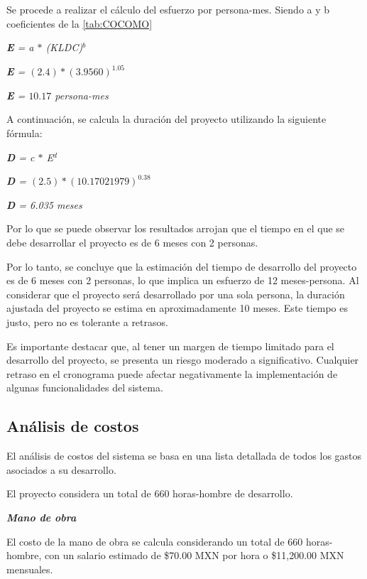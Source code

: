 Se procede a realizar el cálculo del esfuerzo por persona-mes. Siendo a y b coeficientes de la \autoref{tab:COCOMO}

\begin{center}
    \textit{\textbf{E} = a $*$ (KLDC)$^b$}

    \textit{\textbf{E} = $(2.4) * (3.9560)^1.05$}

    \textit{\textbf{E} = $10.17$ persona-mes}
\end{center}
A continuación, se calcula la duración del proyecto utilizando la siguiente fórmula:
\begin{center}
    \textit{\textbf{D} = c $*$ E$^d$}

    \textit{\textbf{D} = $(2.5) * (10.17021979)^{0.38}$}

    \textit{\textbf{D} = 6.035 meses}
\end{center}

Por lo que se puede observar los resultados arrojan que el tiempo en el que se debe desarrollar el proyecto es de 6 meses con 2 personas.

Por lo tanto, se concluye que la estimación del tiempo de desarrollo del proyecto es de 6 meses con 2 personas, lo que implica un esfuerzo de 12 meses-persona. Al considerar que el proyecto será desarrollado por una sola persona, la duración ajustada del proyecto se estima en aproximadamente 10 meses. Este tiempo es justo, pero no es tolerante a retrasos.

Es importante destacar que, al tener un margen de tiempo limitado para el desarrollo del proyecto, se presenta un riesgo moderado a significativo. Cualquier retraso en el cronograma puede afectar negativamente la implementación de algunas funcionalidades del sistema. 

\subsection{Análisis de costos}
El análisis de costos del sistema se basa en una lista detallada de todos los gastos asociados a su desarrollo.

El proyecto considera un total de 660 horas-hombre de desarrollo.

\textit{\textbf{Mano de obra}}

El costo de la mano de obra se calcula considerando un total de 660 horas-hombre, con un salario estimado de \$70.00 MXN por hora o \$11,200.00 MXN mensuales.

